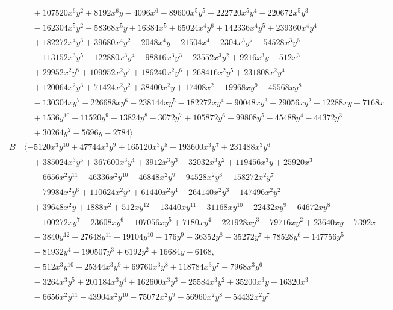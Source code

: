 \documentclass[11pt]{article}
\begin{document}
\begin{longtable}{@{}ll@{}}
 & $\quad +107520x^{6}y^{2}+8192x^{6}y-4096x^{6}-89600x^{5}y^{5}-222720x^{5}y^{4}-220672x^{5}y^{3}$\\
 & $\quad -162304x^{5}y^{2}-58368x^{5}y+16384x^{5}+65024x^{4}y^{6}+142336x^{4}y^{5}+239360x^{4}y^{4}$\\
 & $\quad +182272x^{4}y^{3}+39680x^{4}y^{2}-2048x^{4}y-21504x^{4}+2304x^{3}y^{7}-54528x^{3}y^{6}$\\
 & $\quad -113152x^{3}y^{5}-122880x^{3}y^{4}-98816x^{3}y^{3}-23552x^{3}y^{2}+9216x^{3}y+512x^{3}$\\
 & $\quad +29952x^{2}y^{8}+109952x^{2}y^{7}+186240x^{2}y^{6}+268416x^{2}y^{5}+231808x^{2}y^{4}$\\
 & $\quad +120064x^{2}y^{3}+71424x^{2}y^{2}+38400x^{2}y+17408x^{2}-19968xy^{9}-45568xy^{8}$\\
 & $\quad -130304xy^{7}-226688xy^{6}-238144xy^{5}-182272xy^{4}-90048xy^{3}-29056xy^{2}-12288xy-7168x$\\
 & $\quad +1536y^{10}+11520y^{9}-13824y^{8}-3072y^{7}+105872y^{6}+99808y^{5}-45488y^{4}-44372y^{3}$\\
 & $\quad +30264y^{2}-5696y-2784\rangle$\\
$B$ & $\langle -5120x^{3}y^{10}+47744x^{3}y^{9}+165120x^{3}y^{8}+193600x^{3}y^{7}+231488x^{3}y^{6}$\\
 & $\quad +385024x^{3}y^{5}+367600x^{3}y^{4}+3912x^{3}y^{3}-32032x^{3}y^{2}+119456x^{3}y+25920x^{3}$\\
 & $\quad -6656x^{2}y^{11}-46336x^{2}y^{10}-46848x^{2}y^{9}-94528x^{2}y^{8}-158272x^{2}y^{7}$\\
 & $\quad -79984x^{2}y^{6}+110624x^{2}y^{5}+61440x^{2}y^{4}-264140x^{2}y^{3}-147496x^{2}y^{2}$\\
 & $\quad +39648x^{2}y+1888x^{2}+512xy^{12}-13440xy^{11}-31168xy^{10}-22432xy^{9}-64672xy^{8}$\\
 & $\quad -100272xy^{7}-23608xy^{6}+107056xy^{5}+7180xy^{4}-221928xy^{3}-79716xy^{2}+23640xy-7392x$\\
 & $\quad -3840y^{12}-27648y^{11}-19104y^{10}-176y^{9}-36352y^{8}-35272y^{7}+78528y^{6}+147756y^{5}$\\
 & $\quad -81932y^{4}-190507y^{3}+6192y^{2}+16684y-6168,$\\
 & $\quad -512x^{3}y^{10}-25344x^{3}y^{9}+69760x^{3}y^{8}+118784x^{3}y^{7}-7968x^{3}y^{6}$\\
 & $\quad -3264x^{3}y^{5}+201184x^{3}y^{4}+162600x^{3}y^{3}-25584x^{3}y^{2}+35200x^{3}y+16320x^{3}$\\
 & $\quad -6656x^{2}y^{11}-43904x^{2}y^{10}-75072x^{2}y^{9}-56960x^{2}y^{8}-54432x^{2}y^{7}$\\

\end{longtable}
\end{document}
